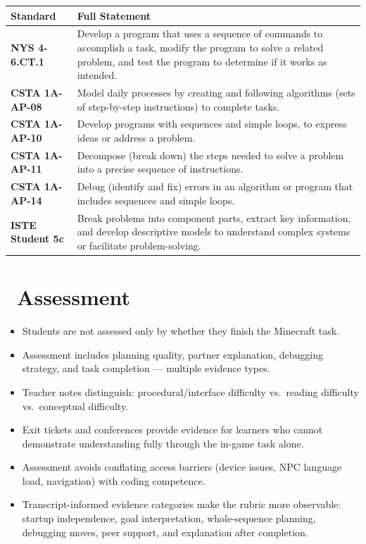 \documentclass[12pt]{article}
\newcommand{\arow}{\rowcolor{altRow}}
\begin{document}
\begin{tabularx}{\textwidth}{|>{\bfseries\color{brickRed}}P{1.5in}|L|}
\hline
{}\color{white}\bfseries Standard & \color{white}\bfseries Full Statement \\
\hline
NYS 4-6.CT.1 & Develop a program that uses a sequence of commands to accomplish a task, modify the program to solve a related problem, and test the program to determine if it works as intended. \\
\hline
\arow CSTA 1A-AP-08 & Model daily processes by creating and following algorithms (sets of step-by-step instructions) to complete tasks. \\
\hline
CSTA 1A-AP-10 & Develop programs with sequences and simple loops, to express ideas or address a problem. \\
\hline
\arow CSTA 1A-AP-11 & Decompose (break down) the steps needed to solve a problem into a precise sequence of instructions. \\
\hline
CSTA 1A-AP-14 & Debug (identify and fix) errors in an algorithm or program that includes sequences and simple loops. \\
\hline
\arow ISTE Student 5c & Break problems into component parts, extract key information, and develop descriptive models to understand complex systems or facilitate problem-solving. \\
\hline
\end{tabularx}

\section{\texorpdfstring{\faChartBar\ Assessment}{Assessment}}

\begin{assessbox}
\begin{itemize}
\item Students are not assessed only by whether they finish the Minecraft task.
\item Assessment includes planning quality, partner explanation, debugging strategy, and task completion --- multiple evidence types.
\item Teacher notes distinguish: procedural/interface difficulty vs.\ reading difficulty vs.\ conceptual difficulty.
\item Exit tickets and conferences provide evidence for learners who cannot demonstrate understanding fully through the in-game task alone.
\item Assessment avoids conflating access barriers (device issues, NPC language load, navigation) with coding competence.
\item Transcript-informed evidence categories make the rubric more observable: startup independence, goal interpretation, whole-sequence planning, debugging moves, peer support, and explanation after completion.
\end{itemize}
\end{assessbox}
\end{document}
